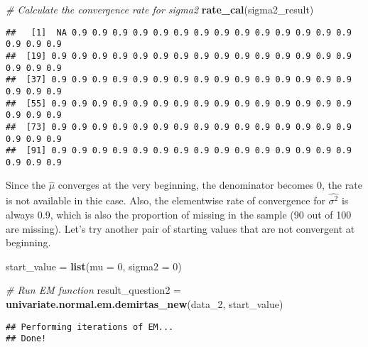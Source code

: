 \documentclass[]{article}
\newenvironment{Shaded}{\begin{snugshade}}{\end{snugshade}}
\newcommand{\CommentTok}[1]{\textcolor[rgb]{0.56,0.35,0.01}{\textit{#1}}}
\newcommand{\DataTypeTok}[1]{\textcolor[rgb]{0.13,0.29,0.53}{#1}}
\newcommand{\DecValTok}[1]{\textcolor[rgb]{0.00,0.00,0.81}{#1}}
\newcommand{\KeywordTok}[1]{\textcolor[rgb]{0.13,0.29,0.53}{\textbf{#1}}}
\newcommand{\NormalTok}[1]{#1}
\newcommand{\OperatorTok}[1]{\textcolor[rgb]{0.81,0.36,0.00}{\textbf{#1}}}
\newcommand{\StringTok}[1]{\textcolor[rgb]{0.31,0.60,0.02}{#1}}
\begin{document}
\begin{Shaded}
\begin{Highlighting}[]
\CommentTok{# Calculate the convergence rate for sigma2}
\KeywordTok{rate_cal}\NormalTok{(sigma2_result)}
\end{Highlighting}
\end{Shaded}

\begin{verbatim}
##   [1]  NA 0.9 0.9 0.9 0.9 0.9 0.9 0.9 0.9 0.9 0.9 0.9 0.9 0.9 0.9 0.9 0.9 0.9
##  [19] 0.9 0.9 0.9 0.9 0.9 0.9 0.9 0.9 0.9 0.9 0.9 0.9 0.9 0.9 0.9 0.9 0.9 0.9
##  [37] 0.9 0.9 0.9 0.9 0.9 0.9 0.9 0.9 0.9 0.9 0.9 0.9 0.9 0.9 0.9 0.9 0.9 0.9
##  [55] 0.9 0.9 0.9 0.9 0.9 0.9 0.9 0.9 0.9 0.9 0.9 0.9 0.9 0.9 0.9 0.9 0.9 0.9
##  [73] 0.9 0.9 0.9 0.9 0.9 0.9 0.9 0.9 0.9 0.9 0.9 0.9 0.9 0.9 0.9 0.9 0.9 0.9
##  [91] 0.9 0.9 0.9 0.9 0.9 0.9 0.9 0.9 0.9 0.9 0.9 0.9 0.9 0.9 0.9 0.9 0.9 0.9
\end{verbatim}

Since the \(\hat\mu\) converges at the very beginning, the denominator
becomes 0, the rate is not available in thie case. Also, the elementwise
rate of convergence for \(\hat{\sigma^2}\) is always 0.9, which is also
the proportion of missing in the sample (90 out of 100 are missing).
Let's try another pair of starting values that are not convergent at
beginning.

\begin{Shaded}
\begin{Highlighting}[]
\NormalTok{start_value =}\StringTok{ }\KeywordTok{list}\NormalTok{(}\DataTypeTok{mu =} \DecValTok{0}\NormalTok{, }\DataTypeTok{sigma2 =} \DecValTok{0}\NormalTok{)}

\CommentTok{# Run EM function}
\NormalTok{result_question2 =}\StringTok{ }\KeywordTok{univariate.normal.em.demirtas_new}\NormalTok{(data_}\DecValTok{2}\NormalTok{, start_value)}
\end{Highlighting}
\end{Shaded}

\begin{verbatim}
## Performing iterations of EM... 
## Done!
\end{verbatim}

\begin{Shaded}
\end{Shaded}
\end{document}
